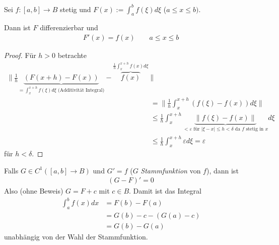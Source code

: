 \begin{theorem} \label{3.5}
  Sei $f: [a,b] \to B$ stetig und $F(x) := \int_a^b f(\xi) d\xi$ ($a \le x \le b)$.

  Dann ist $F$ differenzierbar und 
  \begin{align*}
    F'(x) = f(x) 
    \qquad a \le x \le b
  \end{align*}
  \begin{proof}
    Für $h > 0$ betrachte
    \begin{align*}
      \Big\| \tfrac 1h \underbrace{(F(x+h) - F(x))}_{= \int_x^{x+h}f(\xi) d\xi \text{ (Additivität Integral)}} - \overbrace{f(x)}^{\frac 1h \int_{x}^{x+h}f(x) d\xi} \Big\| \\
      &= \bigg\| \frac 1h \int_x^{x+h} (f(\xi) - f(x)) d\xi \bigg\|  \\
      &\le \frac 1h \int_x^{x+h} \underbrace{\|f(\xi) - f(x)\|}_{< \varepsilon \text{ für } |\xi - x| \le h < \delta \text{ da $f$ stetig in $x$}} d\xi \\
      &\le \frac 1h \int_x^{x+h} \varepsilon d\xi = \varepsilon
    \end{align*}
    für $h < \delta$.
  \end{proof}
\end{theorem}

\begin{theorem} \label{3.6}
  Falls $G \in C^1([a,b] \to B)$ und $G' = f$ ($G$ \emph{Stammfunktion} von $f$), dann ist
  \begin{align*}
    (G - F)' = 0
  \end{align*}
  Also (ohne Beweis) $G = F + c$ mit $c \in B$.
  Damit ist das Integral
  \begin{align*}
    \int_a^b f(x) dx 
    &= F(b) - F(a) \\
    &= G(b) - c - (G(a) - c) \\
    &= G(b) - G(a)
  \end{align*}
  unabhängig von der Wahl der Stammfunktion.
\end{theorem}

